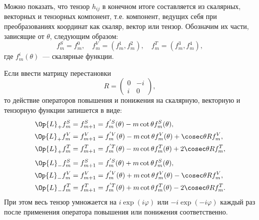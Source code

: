 \documentclass[\docroot/reports/draft/report.tex]{subfiles}
\begin{document}
    Можно показать, что тензор $h_{ij}$ в конечном итоге составляется из скалярных, векторных и тензорных компонент, т.е. компонент, ведущих себя при преобразованиях координат как скаляр, вектор или тензор. Обозначим их части, зависящие от $\theta$, следующим образом:
    \begin{equation}
        f^S_m = f^0_m, \quad
        f^V_m = (f^1_m,f^2_m), \quad
        f^T_m = (f^3_m,f^4_m) ,
    \end{equation}
    где $f^i_m(\theta)$~--- скалярные функции.

    Если ввести матрицу перестановки
    \begin{equation}
        R = \begin{pmatrix}0&-i\\i&0\end{pmatrix} ,
    \end{equation}
    то действие операторов повышения и понижения на скалярную, векторную и тензорную функции запишется в виде:
    \begin{equation}\begin{aligned}
        \Op{L}_{+} f^S_m &= f^S_{m+1} =
            f^{'S}_m(\theta) - m \cot\theta f^S_m(\theta), \\
        \Op{L}_{+} f^V_m &= f^V_{m+1} =
            f^{'V}_m(\theta) - m \cot\theta f^V_m(\theta) + \cosec\theta R f^V_m, \\
        \Op{L}_{+} f^T_m &= f^T_{m+1} =
            f^{'T}_m(\theta) - m \cot\theta f^T_m(\theta) + 2\cosec\theta R f^T_m,
    \end{aligned}\end{equation}
    \begin{equation}\begin{aligned}
        \Op{L}_{-} f^S_m &= f^S_{m+1} =
            f^{'S}_m(\theta) + m \cot\theta f^S_m(\theta), \\
        \Op{L}_{-} f^V_m &= f^V_{m+1} =
            f^{'V}_m(\theta) + m \cot\theta f^V_m(\theta) - \cosec\theta R f^V_m, \\
        \Op{L}_{-} f^T_m &= f^T_{m+1} =
            f^{'T}_m(\theta) + m \cot\theta f^T_m(\theta) - 2\cosec\theta R f^T_m.
    \end{aligned}\end{equation}
    При этом весь тензор умножается на $i \exp(i\varphi)$ или $-i \exp(-i\varphi)$ каждый раз после применения оператора повышения или понижения соответственно.
\end{document}
